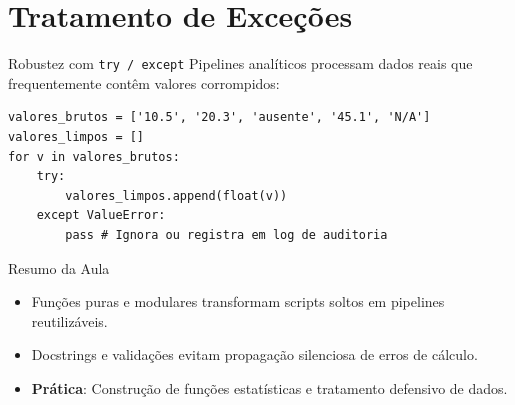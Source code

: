 \documentclass[aspectratio=169, 10pt]{beamer}
\begin{document}
\section{Tratamento de Exceções}

\begin{frame}[fragile]{Robustez com \texttt{try / except}}
  Pipelines analíticos processam dados reais que frequentemente contêm valores corrompidos:
  \begin{lstlisting}
valores_brutos = ['10.5', '20.3', 'ausente', '45.1', 'N/A']
valores_limpos = []
for v in valores_brutos:
    try:
        valores_limpos.append(float(v))
    except ValueError:
        pass # Ignora ou registra em log de auditoria
  \end{lstlisting}
\end{frame}

\begin{frame}{Resumo da Aula}
  \begin{itemize}
    \item Funções puras e modulares transformam scripts soltos em pipelines reutilizáveis.
    \item Docstrings e validações evitam propagação silenciosa de erros de cálculo.
    \item \textbf{Prática}: Construção de funções estatísticas e tratamento defensivo de dados.
  \end{itemize}
\end{frame}
\end{document}

